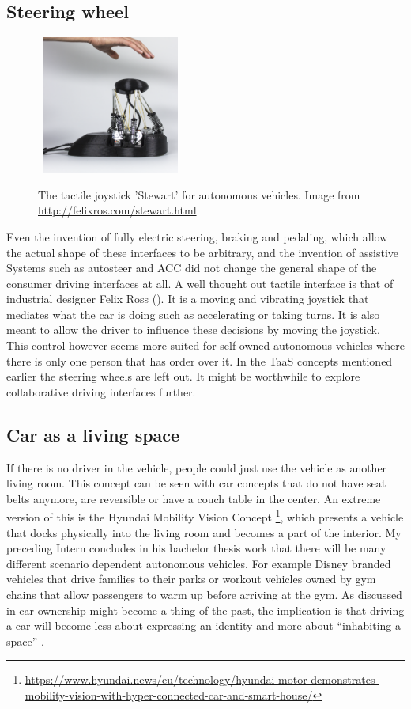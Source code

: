 \subsection{Steering wheel}\label{ssec:steering}
\begin{figure}
   \hfill\ \includegraphics[width=0.4\textwidth]{fig/joystick}\hfill\
    \caption[The tactile joystick 'Stewart' for autonomous vehicles]{The tactile joystick 'Stewart' for autonomous vehicles. Image from \url{http://felixros.com/stewart.html}}
    \label{fig:joystick}
\end{figure}
Even the invention of fully electric steering, braking and pedaling, which allow the actual shape of these interfaces to be arbitrary, and the invention of assistive Systems such as autosteer and ACC did not change the general shape of  the consumer driving interfaces at all. A well thought out tactile interface is that of industrial designer Felix Ross (). It is a moving and vibrating  joystick that mediates what the car is doing such as accelerating or taking turns. It is also meant to allow the driver to influence these decisions by moving the joystick. This control however seems more suited for self owned autonomous vehicles where there is only one person that has order over it. In the TaaS concepts mentioned earlier the steering wheels are left out. It might be worthwhile to explore collaborative driving interfaces further. 

\subsection{Car as a living space}\label{ssec:living}
If there is no driver in the vehicle, people could just use the vehicle as another living room. This concept can be seen with car concepts that do not have seat belts anymore, are reversible or have a couch table in the center. An extreme version of this is the Hyundai Mobility Vision Concept \footnote{\url{https://www.hyundai.news/eu/technology/hyundai-motor-demonstrates-mobility-vision-with-hyper-connected-car-and-smart-house/}}, which presents a vehicle that docks physically into the living room and becomes a part of the interior. My preceding Intern concludes in his bachelor thesis work that there will be many different scenario dependent autonomous vehicles. For example Disney branded vehicles that drive families to their parks or workout vehicles owned by gym chains that allow passengers to warm up before arriving at the gym\cite{Honma2017SystemVehicles}. As discussed in  car ownership might become a thing of the past, the implication is that driving a car will become less about expressing an identity and more about “inhabiting a space” \cite{Laurier2012WhatCar}.

